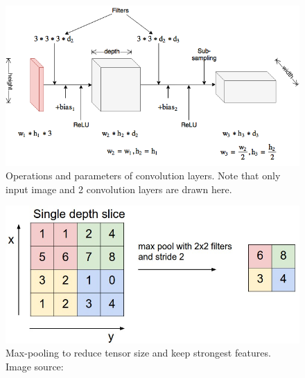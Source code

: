 \begin{figure}[tb]
	\centering
	\includegraphics[width=0.9\hsize]{./figures/convNetsimple}
	\caption{Operations and parameters of convolution layers. Note that only input image and 2 convolution layers are drawn here.}
	\label{fig:convNetsimple}
\end{figure}
\begin{figure}[tb]
	\centering
	\includegraphics[width=0.6\hsize]{./figures/maxpool}
	\caption{Max-pooling to reduce tensor size and keep strongest features. Image source: \cite{cs231n}}
	\label{fig:maxpool}
\end{figure}

